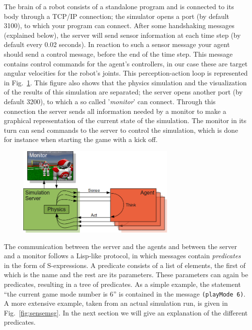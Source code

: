 The brain of a robot consists of a standalone program and is connected to its body through a TCP/IP connection; the simulator opens a port (by default 3100), to which your program can connect. After some handshaking messages (explained below), the server will send sensor information at each time step (by default every 0.02 seconds). In reaction to such a sensor message your agent should send a control message, before the end of the time step. This message contains control commands for the agent's controllers, in our case these are target angular velocities for the robot's joints. This perception-action loop is represented in Fig.~\ref{fig:simulator}. This figure also shows that the physics simulation and the visualization of the results of this simulation are separated; the server opens another port (by default 3200), to which a so called '\emph{monitor}' can connect. Through this connection the server sends all information needed by a monitor to make a graphical representation of the current state of the simulation. The monitor in its turn can send commands to the server to control the simulation, which is done for instance when starting the game with a kick off.

\begin{figure}[t]
\begin{center}
	\includegraphics[width=0.70\textwidth]{simulator}
	\label{fig:simulator}
\end{center}
\end{figure}

The communication between the server and the agents and between the server and a monitor follows a Lisp-like protocol, in which messages contain \emph{predicates} in the form of {S-expressions}. A predicate consists of a list of elements, the first of which is the name and the rest are its parameters. These parameters can again be predicates, resulting in a tree of predicates. As a simple example, the statement ``the current game mode number is 6'' is contained in the message {\tt (playMode 6)}. A more extensive example, taken from an actual simulation run, is given in Fig.~\ref{fig:sensemsg}. In the next section we will give an explanation of the different predicates.

